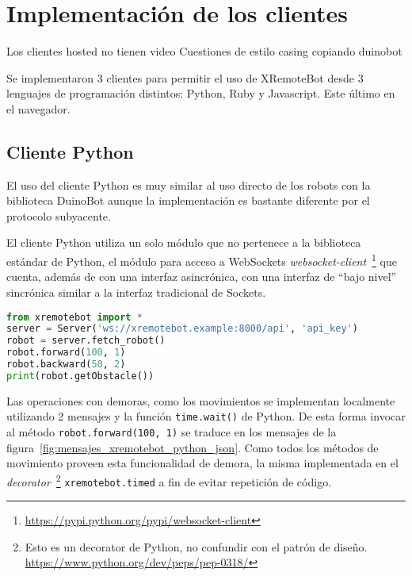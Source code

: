 
\chapter{Implementación de los clientes}\label{ch4}
Los clientes hosted no tienen video %
Cuestiones de estilo casing copiando duinobot

Se implementaron 3 clientes para permitir el uso de XRemoteBot desde 3
lenguajes de programación distintos: Python, Ruby y Javascript. Este último
en el navegador.

\section{Cliente Python}\label{ch4:python}
El uso del cliente Python es muy similar al uso directo de los robots con la
biblioteca DuinoBot aunque la implementación es bastante diferente por el protocolo
subyacente.

El cliente Python utiliza un solo módulo que no pertenece a la biblioteca estándar
de Python, el módulo para acceso a WebSockets
\textit{websocket-client}~\footnote{\url{https://pypi.python.org/pypi/websocket-client}}
que cuenta, además de con una interfaz asincrónica, con una interfaz de ``bajo nivel''
sincrónica similar a la interfaz tradicional de Sockets.

\begin{lstlisting}[language=Python,
caption={Ejemplo con XRemoteBot para Python},label=lst:ejemplo_xremotebot_python]
from xremotebot import *
server = Server('ws://xremotebot.example:8000/api', 'api_key')
robot = server.fetch_robot()
robot.forward(100, 1)
robot.backward(50, 2)
print(robot.getObstacle())
\end{lstlisting}


Las operaciones con demoras, como los movimientos se implementan localmente
utilizando 2 mensajes y la función \texttt{time.wait()} de Python. De esta
forma
invocar al método \texttt{robot.forward(100, 1)} se traduce en los mensajes
de
la figura~\ref{fig:mensajes_xremotebot_python_json}. Como todos los métodos
de movimiento
proveen esta funcionalidad de demora, la misma implementada en el
\textit{decorator}~\footnote{Esto es un decorator de Python, no confundir
con el patrón de diseño. \url{https://www.python.org/dev/peps/pep-0318/}}
\texttt{xremotebot.timed} a fin de evitar repetición de código.

